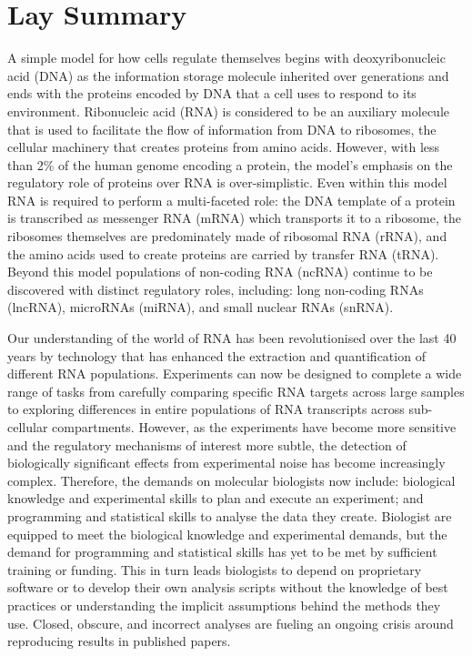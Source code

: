 \documentclass[../main.tex]{subfiles}
\begin{document}
\chapter{Lay Summary}
\onehalfspacing

A simple model for how cells regulate themselves begins with deoxyribonucleic acid (DNA) as the information storage molecule inherited over generations and ends with the proteins encoded by DNA that a cell uses to respond to its environment.
Ribonucleic acid (RNA) is considered to be an auxiliary molecule that is used to facilitate the flow of information from DNA to ribosomes, the cellular machinery that creates proteins from amino acids.
However, with less than 2\% of the human genome encoding a protein, the model's emphasis on the regulatory role of proteins over RNA is over-simplistic.
Even within this model RNA is required to perform a multi-faceted role: the DNA template of a protein is transcribed as messenger RNA (mRNA) which transports it to a ribosome, the ribosomes themselves are predominately made of ribosomal RNA (rRNA), and the amino acids used to create proteins are carried by transfer RNA (tRNA).
Beyond this model populations of non-coding RNA (ncRNA) continue to be discovered with distinct regulatory roles, including: long non-coding RNAs (lncRNA), microRNAs (miRNA), and small nuclear RNAs (snRNA).

Our understanding of the world of RNA has been revolutionised over the last 40 years by technology that has enhanced the extraction and quantification of different RNA populations.
Experiments can now be designed to complete a wide range of tasks from carefully comparing specific RNA targets across large samples to exploring differences in entire populations of RNA transcripts across sub-cellular compartments. 
However, as the experiments have become more sensitive and the regulatory mechanisms of interest more subtle, the detection of biologically significant effects from experimental noise has become increasingly complex.
Therefore, the demands on molecular biologists now include: biological knowledge and experimental skills to plan and execute an experiment; and programming and statistical skills to analyse the data they create.
Biologist are equipped to meet the biological knowledge and experimental demands, but the demand for programming and statistical skills has yet to be met by sufficient training or funding.
This in turn leads biologists to depend on proprietary software or to develop their own analysis scripts without the knowledge of best practices or understanding the implicit assumptions behind the methods they use.
Closed, obscure, and incorrect analyses are fueling an ongoing crisis around reproducing results in published papers.
\end{document}
